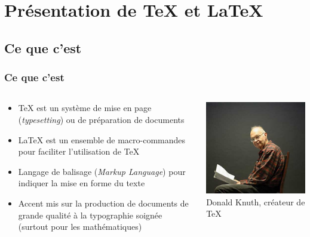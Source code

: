 \section{Présentation de {\TeX} et {\LaTeX}}

\subsection{Ce que c'est}

\begin{frame}
  \frametitle{Ce que c'est}
  \begin{columns}
    \begin{column}{.5\textwidth}
      \begin{itemize}
      \item {\TeX} est un système de mise en page (\emph{typesetting})
        ou de préparation de documents
      \item {\LaTeX} est un ensemble de macro-commandes pour faciliter
        l'utilisation de {\TeX}
      \item Langage de balisage (\emph{Markup Language}) pour indiquer
        la mise en forme du texte
      \item Accent mis sur la production de documents de grande
        qualité à la typographie soignée (surtout pour les
        mathématiques)
      \end{itemize}
    \end{column}
    \begin{column}{.5\textwidth}
      \centering
      \includegraphics[width=\linewidth]{Knuth} \\
      \footnotesize Donald Knuth, créateur de \TeX
    \end{column}
  \end{columns}
\end{frame}

